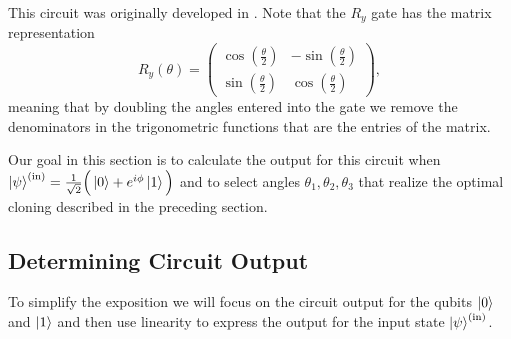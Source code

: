 \documentclass[reqno]{amsart}
\numberwithin{lemma}{section}
\numberwithin{proposition}{section}
\begin{document}
{This circuit was originally developed in \cite{PhysRevA.56.3446}. Note that the $R_{y}$ gate has the matrix representation
\begin{equation*}
R_{y}(\theta) = \left ( \begin{matrix} 
\cos \left ( \frac{\theta}{2} \right ) & -\sin \left ( \frac{\theta}{2} \right )\\
\sin \left ( \frac{\theta}{2} \right ) & \cos\left ( \frac{\theta}{2} \right )
\end{matrix} \right ),
\end{equation*}
meaning that by doubling the angles entered into the gate we remove the denominators in the trigonometric functions that are the entries of the matrix.

Our goal in this section is to calculate the output for this circuit when $\ket{\psi}^{(\textnormal{in)}} = \frac{1}{\sqrt{2}} \Big ( \ket{0} + e^{i\phi} \ket{1} \Big )$ and to select angles $\theta_{1}, \theta_{2}, \theta_{3}$ that realize the optimal cloning described in the preceding section.

\subsection{Determining Circuit Output}
To simplify the exposition we will focus on the circuit output for the qubits $\ket{0}$ and $\ket{1}$ and then use linearity to express the output for the input state $\ket{\psi}^{(\textnormal{in})}$.

}
\end{document}
